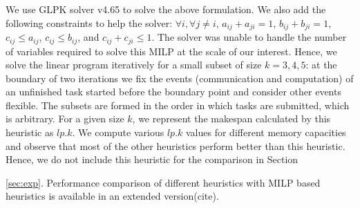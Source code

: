 \documentclass[sigconf]{acmart}
\begin{document}
	
	We use GLPK solver v4.65 to solve the above formulation. We also add the following constraints to help the solver: $\forall i, \forall j\ne i$, $a_{ij} + a_{ji}=1$, $b_{ij} + b_{ji} = 1$, $c_{ij} \le a_{ij}$, $c_{ij} \le b_{ij}$, and  $c_{ij} + c_{ji} \le 1$.  The solver was unable to handle the number of variables required to solve this MILP at the scale of our interest. Hence, we solve the linear program iteratively for a small subset of size $k=3,4,5$: at the boundary of two iterations we fix the events (communication and computation) of an unfinished task started before the boundary point and consider other events flexible. The subsets are formed in the order in which tasks are submitted, which is arbitrary. For a given size $k$, we represent the makespan calculated by this heuristic as $lp.k$.
	We compute various $lp.k$ values for different memory capacities and observe that most of the other heuristics perform better than this heuristic. Hence, we do not include this heuristic for the comparison in Section~{\ref{sec:exp}. Performance comparison of different heuristics with MILP based heuristics is available in an extended version(cite).
		
}
\end{document}
